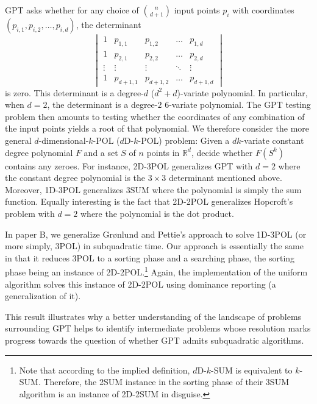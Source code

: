 GPT asks whether for any choice of \(n \choose d+1\) input points \(p_i\) with
coordinates \((p_{i,1} , p_{i,2} , \ldots, p_{i,d} )\),
the determinant
%
\begin{displaymath}
  \begin{vmatrix}
    1 & p_{1,1} & p_{1,2} & \hdots & p_{1,d} \\
    1 & p_{2,1} & p_{2,2} & \hdots & p_{2,d} \\
    \vdots & \vdots & \vdots & \ddots & \vdots \\
    1 & p_{d+1,1} & p_{d+1,2} & \hdots & p_{d+1,d}
  \end{vmatrix}
\end{displaymath}
is zero. This determinant is a degree-\(d\) (\(d^2 + d\))-variate polynomial.
In particular, when \(d=2\), the determinant is a degree-\(2\) \(6\)-variate
polynomial. The GPT testing problem then amounts to testing whether the
coordinates of any combination of the input points yields a root of that
polynomial. We therefore consider the more general \(d\)-dimensional-\(k\)-POL
(\(d\)D-\(k\)-POL) problem:
%
Given a \(dk\)-variate constant degree polynomial \(F\) and a set \(S\) of \(n\) points
in \(\mathbb{R}^d\), decide whether \(F(S^k)\) contains any zeroes.
%
For instance, 2D-3POL generalizes GPT with \(d=2\) where the constant degree
polynomial is the \(3 \times 3\) determinant mentioned above. Moreover, 1D-3POL
generalizes 3SUM where the polynomial is simply the sum function. Equally
interesting is the fact that 2D-2POL generalizes Hopcroft's problem with
\(d=2\) where the polynomial is the dot product.

In paper B, we generalize Gr\o nlund and Pettie's approach to solve 1D-3POL (or
more simply, 3POL) in subquadratic time. Our approach is essentially the same
in that it reduces 3POL to a sorting phase and a searching phase, the sorting
phase being an instance of 2D-2POL.\footnote{Note that according to the implied
definition, \(d\)D-\(k\)-SUM is equivalent to \(k\)-SUM. Therefore, the 2SUM
instance in the sorting phase of their 3SUM algorithm is an instance of 2D-2SUM
in disguise.} Again, the implementation of the uniform algorithm solves this
instance of 2D-2POL using dominance reporting (a generalization of it).

This result illustrates why a better understanding of the landscape of problems
surrounding GPT helps to identify intermediate problems whose resolution marks
progress towards the question of whether GPT admits subquadratic algorithms.

